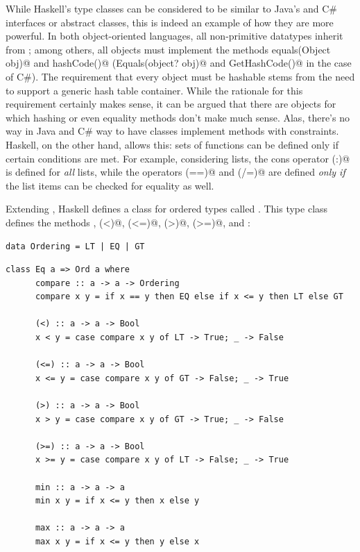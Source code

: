 \documentclass[UdineBachThesis,american,11pt,draft]{PhdThesis}
\begin{document}
  While Haskell's type classes can be considered to be similar to Java's and C\#
  interfaces or abstract classes, this is indeed an example of how they are more
  powerful. In both object-oriented languages, all non-primitive datatypes
  inherit from \lstinline@Object@; among others, all objects must implement the
  methods \lstinline@boolean equals(Object obj)@ and \lstinline@int hashCode()@
  (\lstinline@bool Equals(object? obj)@ and \lstinline@int GetHashCode()@ in the
  case of C\#). The requirement that every object must be hashable stems from
  the need to support a generic hash table container. While the rationale for
  this requirement certainly makes sense, it can be argued that there are
  objects for which hashing or even equality methods don't make much sense.
  Alas, there's no way in Java and C\# way to have classes implement methods
  with constraints. Haskell, on the other hand, allows this: sets of functions
  can be defined only if certain conditions are met. For example, considering
  lists, the cons operator \lstinline@(:)@ is defined for \emph{all} lists,
  while the operators \lstinline@(==)@ and \lstinline@(/=)@ are defined
  \emph{only if} the list items can be checked for equality as well.

  Extending \lstinline@Eq@, Haskell defines a class for ordered types called
  \lstinline@Ord@. This type class defines the methods \lstinline@compare@,
  \lstinline@(<)@, \lstinline@(<=)@, \lstinline@(>)@, \lstinline@(>=)@,
  \lstinline@min@ and \lstinline@max@:

  \begin{lstlisting}[gobble=4,basicstyle=\ttfamily\small]
    data Ordering = LT | EQ | GT
  \end{lstlisting}

  \begin{lstlisting}[gobble=4,basicstyle=\ttfamily\small]
    class Eq a => Ord a where
      compare :: a -> a -> Ordering
      compare x y = if x == y then EQ else if x <= y then LT else GT

      (<) :: a -> a -> Bool
      x < y = case compare x y of LT -> True; _ -> False

      (<=) :: a -> a -> Bool
      x <= y = case compare x y of GT -> False; _ -> True

      (>) :: a -> a -> Bool
      x > y = case compare x y of GT -> True; _ -> False

      (>=) :: a -> a -> Bool
      x >= y = case compare x y of LT -> False; _ -> True

      min :: a -> a -> a
      min x y = if x <= y then x else y

      max :: a -> a -> a
      max x y = if x <= y then y else x
  \end{lstlisting}
\end{document}
